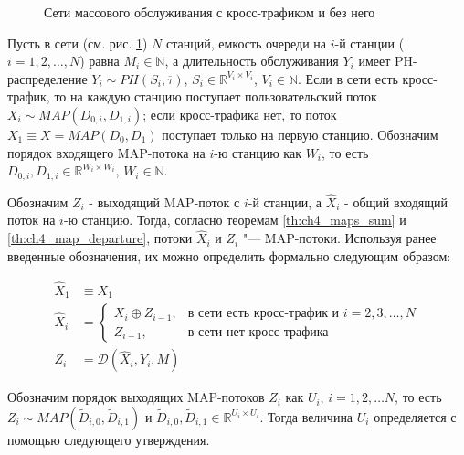 \begin{figure}[htb]
  \caption{Сети массового обслуживания с кросс-трафиком и без него}
  \label{fig:ch4_queueing_networks}
\end{figure}

Пусть в сети (см. рис. \ref{fig:ch4_queueing_networks}) $N$ станций, емкость очереди на $i$-й станции ($i = 1,2, \dots, N$) равна $M_i \in \mathbb{N}$, а длительность обслуживания $Y_i$ имеет PH-распределение $Y_i \sim PH(S_i, \overline{\tau})$, $S_i \in \mathbb{R}^{V_i \times V_i}$, $V_i \in \mathbb{N}$. Если в сети есть кросс-трафик, то на каждую станцию поступает пользовательский поток $X_i \sim MAP(D_{0,i}, D_{1,i})$; если кросс-трафика нет, то поток $X_1 \equiv X = MAP(D_0, D_1)$ поступает только на первую станцию. Обозначим порядок входящего MAP-потока на $i$-ю станцию как $W_i$, то есть $D_{0,i}, D_{1,i} \in \mathbb{R}^{W_i \times W_i}$, $W_i \in \mathbb{N}$.

Обозначим $Z_i$ - выходящий MAP-поток с $i$-й станции, а $\hat{X}_i$ - общий входящий поток на $i$-ю станцию. Тогда, согласно теоремам \ref{th:ch4_maps_sum} и \ref{th:ch4_map_departure}, потоки $\hat{X}_i$ и $Z_i$ "--- MAP-потоки. Используя ранее введенные обозначения, их можно определить формально следующим образом:

\begin{equation}
  \label{eq:ch4_total_arrival_and_departure}
  \begin{aligned}
    \hat{X}_1 &\equiv X_1\\
    \hat{X}_i &= \begin{cases}
      X_i \oplus Z_{i-1},&\text{в сети есть кросс-трафик и } i = 2,3, \dots, N\\
      Z_{i-1},&\text{в сети нет кросс-трафика}
    \end{cases}\\
    Z_i &= \mathcal{D}(\hat{X}_i, Y_i, M)
  \end{aligned}
\end{equation}

Обозначим порядок выходящих MAP-потоков $Z_i$ как $U_i$, $i=1,2,\dots N$, то есть $Z_i \sim MAP(\tilde{D}_{i,0}, \tilde{D}_{i,1})$ и $\tilde{D}_{i,0}, \tilde{D}_{i,1} \in \mathbb{R}^{U_i \times U_i}$. Тогда величина $U_i$ определяется с помощью следующего утверждения.

